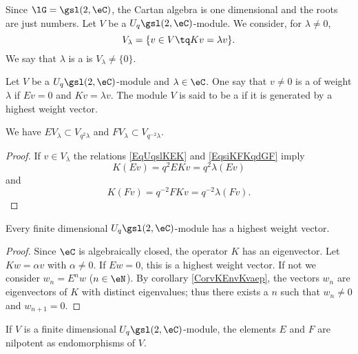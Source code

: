 Since \( \lG=\gsl(2,\eC)\), the Cartan algebra is one dimensional and the roots are just numbers. Let \( V\) be a \( U_q\gsl(2,\eC)\)-module. We consider, for \( \lambda\neq 0\), 
\begin{equation}
    V_{\lambda}=\{ v\in V\tq Kv=\lambda v \}.
\end{equation}
We say that \( \lambda\) is a  is \( V_{\lambda}\neq\{ 0 \}\).

Let \( V\) be a \( U_q\gsl(2,\eC)\)-module and \( \lambda\in\eC\). One say that \( v\neq 0\) is a  of weight \( \lambda\) if \( Ev=0\) and \( Kv=\lambda v\). The module \( V\) is said to be a  if it is generated by a highest weight vector.

\begin{lemma}
    We have \( E V_{\lambda}\subset V_{q^2\lambda}\) and \( FV_{\lambda}\subset V_{q^{-2}\lambda}\).
\end{lemma}

\begin{proof}
    If \( v\in V_{\lambda}\) the relations \eqref{EqUqslKEK} and \eqref{EqsiKFKqdGF} imply
    \begin{equation}
        K(Ev)=q^2EKv=q^2\lambda(Ev)
    \end{equation}
    and
    \begin{equation}
        K(Fv)=q^{-2}FKv=q^{-2}\lambda(Fv).
    \end{equation}
\end{proof}

\begin{proposition}     \label{PropFDmodulehashiweightvec}
    Every finite dimensional \( U_q\gsl(2,\eC)\)-module has a highest weight vector.
\end{proposition}

\begin{proof}
    Since \( \eC\) is algebraically closed, the operator \( K\) has an eigenvector. Let \( Kw=\alpha v\) with \( \alpha\neq 0\). If \( Ew=0\), this is a highest weight vector. If not we consider \( w_n=E^nw\) (\( n\in\eN\)). By corollary \ref{CorvKEnvKvaep}, the vectors \( w_n\) are eigenvectors of \( K\) with distinct eigenvalues; thus there exists a \( n\) such that \( w_n\neq 0\) and \( w_{n+1}=0\).
\end{proof}

\begin{lemma}
    If \( V\) is a finite dimensional \( U_q\gsl(2,\eC)\)-module, the elements \( E\) and \( F\) are nilpotent as endomorphisms of \( V\).
\end{lemma}

